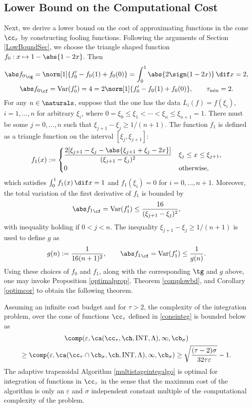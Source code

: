 \subsection{Lower Bound on the Computational Cost}
Next, we derive a lower bound on the cost of approximating functions in the cone $\cc_{\tau}$ by constructing fooling functions. Following the arguments of Section \ref{LowBoundSec}, we choose  the triangle shaped function $f_0: x \mapsto 1-\abs{1-2x}$. Then
\begin{gather*}
\Gnorm{f_0}=\norm[1]{f'_0-f_0(1)+f_0(0)}=\int_0^1 \abs{2\sign(1-2x)} \, \dif x = 2, \\ \Fnorm{f_0}=\Var(f'_0)=4= 2 \norm[1]{f'_0-f_0(1)+f_0(0)}, \qquad \tau_{\min}=2.
\end{gather*}
For any $n \in \naturals$, suppose that the one has the data $L_i(f)=f(\xi_i)$, $i=1, \ldots, n$ for arbitrary $\xi_i$, where $0=\xi_0 \le \xi_1 < \cdots < \xi_n \le \xi_{n+1} = 1$.  There must be some $j=0, \ldots, n$ such that $\xi_{j+1} - \xi_j \ge 1/(n+1)$.  The function $f_{1}$ is defined as a triangle function on the interval $[\xi_j, \xi_{j+1}]$:
$$
f_{1}(x):=\begin{cases} \displaystyle
\frac{2[\xi_{j+1}-\xi_{j}-\abs{\xi_{j+1}+\xi_{j}-2x}]}{(\xi_{j+1}-\xi_{j})^2} & \xi_{j} \le x \leq \xi_{j+1},\\
0 & \text{otherwise},
\end{cases}
$$
which satisfies $\int_0^1 f_1(x) \, \dif x=1$ and $f_1(\xi_i)=0$ for $i=0, \ldots, n+1$.  Moreover, the total variation of the first derivative of $f_1$ is bounded by
\begin{equation*}
\Fnorm{f_1}=\Var(f'_1)\le\frac{16}{(\xi_{j+1}-\xi_{j})^2},
\end{equation*}
with inequality holding if $0 < j < n$.  The inequality $\xi_{j+1} - \xi_j \ge 1/(n+1)$ is used to define $g$ as
\[
g(n) := \frac{1}{16(n+1)^2}, \qquad \Fnorm{f_1}=\Var(f'_1) \le \frac{1}{g(n)}.
\]
Using these choices of $f_0$ and $f_1$, along with the corresponding $\tg$ and $g$ above, one may invoke Proposition \ref{optimalprop}, Theorem \ref{complowbd}, and Corollary \ref{optimcor} to obtain the following theorem.

\begin{theorem} \label{complowbdinteg} Assuming an infinite cost budget and for $\tau>2$, the complexity of the integration problem, over the cone of functions $\cc_{\tau}$ defined in \eqref{coneinteg} is bounded below as
\begin{multline*}
\comp(\varepsilon,\ca(\cc_{\tau},\ch,\INT,\Lambda),\infty,\cb_{\sigma}) \\ \ge \comp(\varepsilon,\ca(\cc_{\tau}\cap \cb_{\sigma},\ch,\INT,\Lambda),\infty,\cb_{\sigma})
\ge \sqrt{\frac{(\tau-2)\sigma}{32 \tau \varepsilon}} -1 .
\end{multline*}
The adaptive trapezoidal Algorithm \ref{multistageintegalgo} is optimal for integration of functions in $\cc_{\tau}$ in the sense that the maximum cost of the algorithm is only an $\varepsilon$ and $\sigma$ independent constant multiple of the computational complexity of the problem.
\end{theorem}

